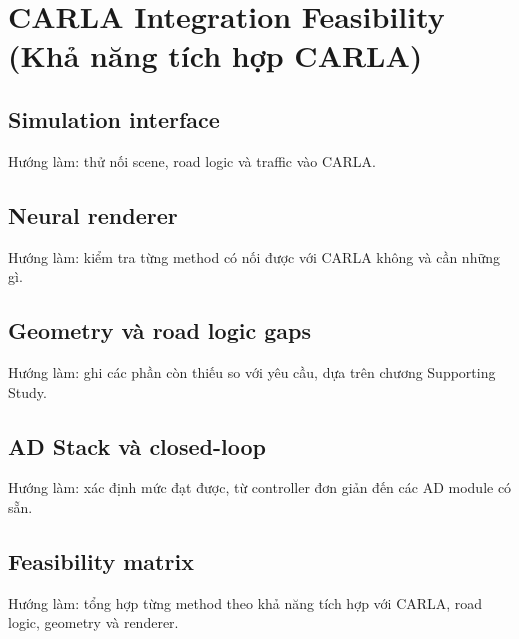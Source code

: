 \chapter{CARLA Integration Feasibility (Khả năng tích hợp CARLA)}

\section{Simulation interface}

Hướng làm: thử nối scene, road logic và traffic vào CARLA.

\section{Neural renderer}

Hướng làm: kiểm tra từng method có nối được với CARLA không và cần những gì.

\section{Geometry và road logic gaps}

Hướng làm: ghi các phần còn thiếu so với yêu cầu, dựa trên chương Supporting Study.

\section{AD Stack và closed-loop}

Hướng làm: xác định mức đạt được, từ controller đơn giản đến các AD module có sẵn.

\section{Feasibility matrix}

Hướng làm: tổng hợp từng method theo khả năng tích hợp với CARLA, road logic, geometry và renderer.
